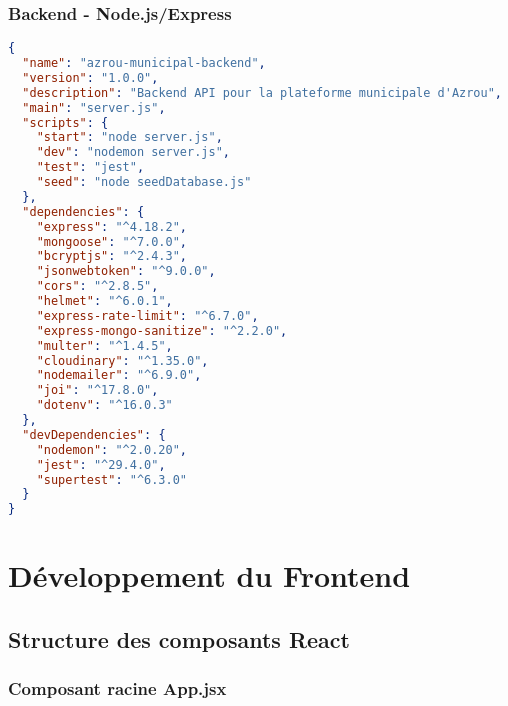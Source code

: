 \subsubsection{Backend - Node.js/Express}

\begin{lstlisting}[language=JSON, caption=Package.json Backend]
{
  "name": "azrou-municipal-backend",
  "version": "1.0.0",
  "description": "Backend API pour la plateforme municipale d'Azrou",
  "main": "server.js",
  "scripts": {
    "start": "node server.js",
    "dev": "nodemon server.js",
    "test": "jest",
    "seed": "node seedDatabase.js"
  },
  "dependencies": {
    "express": "^4.18.2",
    "mongoose": "^7.0.0",
    "bcryptjs": "^2.4.3",
    "jsonwebtoken": "^9.0.0",
    "cors": "^2.8.5",
    "helmet": "^6.0.1",
    "express-rate-limit": "^6.7.0",
    "express-mongo-sanitize": "^2.2.0",
    "multer": "^1.4.5",
    "cloudinary": "^1.35.0",
    "nodemailer": "^6.9.0",
    "joi": "^17.8.0",
    "dotenv": "^16.0.3"
  },
  "devDependencies": {
    "nodemon": "^2.0.20",
    "jest": "^29.4.0",
    "supertest": "^6.3.0"
  }
}
\end{lstlisting}

\section{Développement du Frontend}

\subsection{Structure des composants React}

\subsubsection{Composant racine App.jsx}

